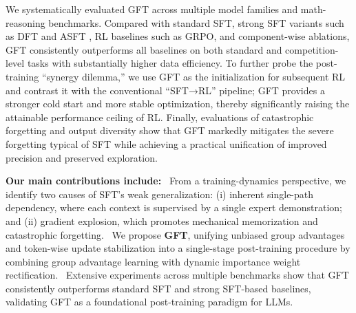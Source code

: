 We systematically evaluated GFT across multiple model families and math-reasoning benchmarks. Compared with standard SFT, strong SFT variants such as DFT \cite{wu2025generalization} and ASFT \cite{zhu2025anchored}, RL baselines such as GRPO, and component-wise ablations, GFT consistently outperforms all baselines on both standard and competition-level tasks with substantially higher data efficiency. To further probe the post-training “synergy dilemma,” we use GFT as the initialization for subsequent RL and contrast it with the conventional “SFT→RL” pipeline; GFT provides a stronger cold start and more stable optimization, thereby significantly raising the attainable performance ceiling of RL. Finally, evaluations of catastrophic forgetting and output diversity show that GFT markedly mitigates the severe forgetting typical of SFT while achieving a practical unification of improved precision and preserved exploration.

\noindent\textbf{Our main contributions include:}
\newline\textbullet\ From a training-dynamics perspective, we identify two causes of SFT’s weak generalization:
(i) inherent single-path dependency, where each context is supervised by a single expert demonstration; and
(ii) gradient explosion, which promotes mechanical memorization and catastrophic forgetting.
\newline\textbullet\ We propose \textbf{GFT}, unifying unbiased group advantages and token-wise update stabilization into a single-stage post-training procedure by combining group advantage learning with dynamic importance weight rectification.
\newline\textbullet\ Extensive experiments across multiple benchmarks show that GFT consistently outperforms standard SFT and strong SFT-based baselines, validating GFT as a foundational post-training paradigm for LLMs.






